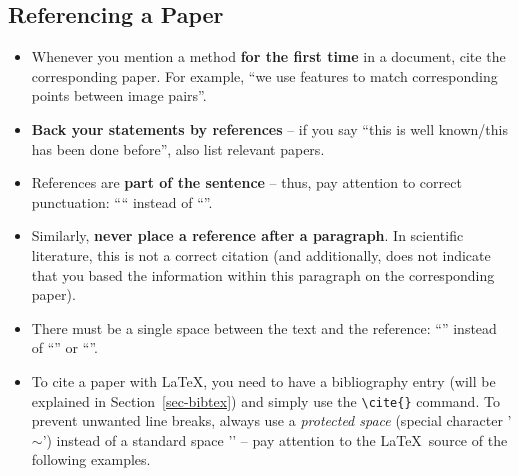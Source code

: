 \documentclass[11pt,a4paper]{article}
\begin{document}
\subsection{Referencing a Paper}
\begin{itemize}
\item Whenever you mention a method \textbf{for the first time} in a document, cite the corresponding paper. For example, ``we use  features to match corresponding points between image pairs''.

\item \textbf{Back your statements by references} -- if you say ``this is well known/this has been done before'', also list relevant papers.

\item References are \textbf{part of the sentence} -- thus, pay attention to correct punctuation: ```` instead of ``''.
 
\item Similarly, \textbf{never place a reference after a paragraph}. In scientific literature, this is not a correct citation (and additionally, does not indicate that you based the information within this paragraph on the corresponding paper).
 
\item There must be a single space between the text and the reference: ``'' instead of ``'' or ``''.
 
\item To cite a paper with \LaTeX, you need to have a bibliography entry (will be explained in Section~\ref{sec-bibtex}) and simply use the \texttt{\textbackslash{cite}\{\}} command. To prevent unwanted line breaks, always use a \emph{protected space} (special character '\texttt{$\sim$}')  instead of a standard space '\textvisiblespace' -- pay attention to the \LaTeX~source of the following examples.
\end{itemize}
% 
\begin{goodexample}
  \begin{NoHyper}
    
  
  \end{NoHyper}
\end{goodexample}
\end{document}
